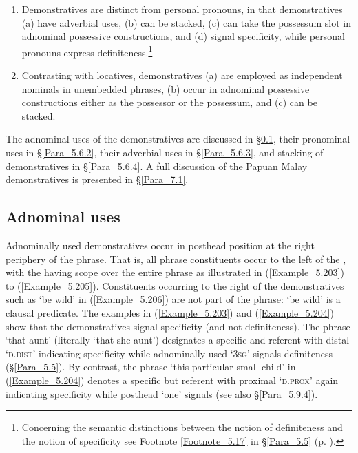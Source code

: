 \begin{enumerate}
\item 
Demonstratives are distinct from personal pronouns, in that demonstratives (a) have adverbial uses, (b) can be stacked, (c) can take the possessum slot in adnominal possessive constructions, and (d) signal specificity, while personal pronouns express definiteness.\footnote{Concerning the semantic distinctions between the notion of definiteness and the notion of specificity see Footnote \ref{Footnote_5.17} in §\ref{Para_5.5} (p. \pageref{Footnote_5.17}).}

\item 
Contrasting with locatives, demonstratives (a) are employed as independent nominals in unembedded  phrases, (b) occur in adnominal possessive constructions either as the possessor or the possessum, and (c) can be stacked.

\end{enumerate}

The adnominal uses of the demonstratives are discussed in §\ref{Para_5.6.1}, their pronominal uses in §\ref{Para_5.6.2}, their adverbial uses in §\ref{Para_5.6.3}, and stacking of demonstratives in §\ref{Para_5.6.4}. A full discussion of the Papuan Malay demonstratives is presented in §\ref{Para_7.1}.


\subsection{Adnominal uses}
\label{Para_5.6.1}
Adnominally used demonstratives occur in posthead position at the right periphery of the  phrase. That is, all  phrase constituents occur to the left of the , with the  having scope over the entire  phrase as illustrated in (\ref{Example_5.203}) to (\ref{Example_5.205}). Constituents occurring to the right of the demonstratives such as  ‘be wild’ in (\ref{Example_5.206}) are not part of the  phrase:  ‘be wild’ is a clausal predicate. The examples in (\ref{Example_5.203}) and (\ref{Example_5.204}) show that the demonstratives signal specificity (and not definiteness). The  phrase  ‘that aunt’ (literally ‘that she aunt’) designates a specific and  referent with distal  ‘\textsc{d.dist}’ indicating specificity while adnominally used  ‘\textsc{3sg}’ signals definiteness (§\ref{Para_5.5}). By contrast, the  phrase  ‘this particular small child’ in (\ref{Example_5.204}) denotes a specific but  referent with proximal  ‘\textsc{d.prox}’ again indicating specificity while posthead  ‘one’ signals  (see also §\ref{Para_5.9.4}).


